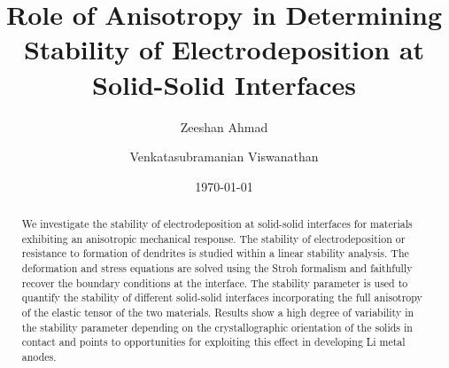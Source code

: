 \documentclass[%
reprint,
 amsmath,amssymb,
 aps,
 prb,
]{revtex4-1}
\begin{document}

\title{Role of Anisotropy in Determining Stability of Electrodeposition at Solid-Solid Interfaces}

\author{Zeeshan Ahmad}
\author{Venkatasubramanian Viswanathan}

\date{\today}

\begin{abstract}
We investigate the stability of electrodeposition at solid-solid interfaces for materials exhibiting an anisotropic mechanical response. The stability of electrodeposition or resistance to formation of dendrites is studied within a linear stability analysis. The deformation and stress equations are solved using the Stroh formalism and faithfully recover the boundary conditions at the interface. The stability parameter is used to quantify the stability of different solid-solid interfaces incorporating the full anisotropy of the elastic tensor of the two materials. Results show a high degree of variability in the stability parameter depending on the crystallographic orientation of the solids in contact and points to opportunities for exploiting this effect in developing Li metal anodes.
\end{abstract}

\maketitle
\end{document}
